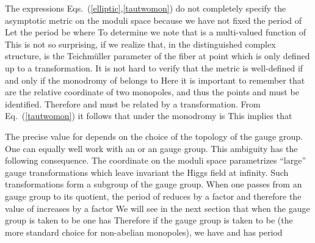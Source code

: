 \documentclass[a4paper,12pt, amsfonts, amssymb]{article}
\providecommand{\ZZ}{{\mathbb Z}}
\providecommand{\NN}{{\mathbb N}}
\providecommand{\ra}{\rightarrow}
\begin{document}
The expressions Eqs.~(\ref{elliptic},\ref{tautwomon}) do not completely specify the asymptotic metric on the moduli space because we have not fixed the period of \coordHE{}
Let the period be \coordHE{} where \coordHE{} To determine \coordHE{}
we note that \coordHE{} is a multi-valued function of \coordHE{} This is not
so surprising, if we realize that, in the distinguished complex structure,
\coordHE{} is the Teichm\"uller parameter of the \coordHE{} fiber at point \coordHE{}
which is only defined up to a \myHighlight{$PSL_2(\ZZ)$}\coordHE{} transformation. It is not hard to
verify that the metric is well-defined if and only if the monodromy of
\coordHE{} belongs to \myHighlight{$PSL_2(\ZZ).$}\coordHE{}
Here it is important to remember that \coordHE{} are the relative coordinate
of two monopoles, and thus the points \coordHE{} and \coordHE{}
must be identified. Therefore \coordHE{} and \coordHE{} must
be related by a \myHighlight{$PSL_2(\ZZ)$}\coordHE{} transformation. From Eq.~(\ref{tautwomon})
it follows that under \myHighlight{$z\ra -z$}\coordHE{} the monodromy is \myHighlight{$\tau\ra\tau +1.$}\coordHE{}
This implies that \myHighlight{$p\in\NN.$}\coordHE{}

The precise value for \coordHE{} depends on the choice of the topology of the
gauge group. One can equally well work with an \coordHE{} or an \myHighlight{$SO(3)=SU(2)/\ZZ_2$}\coordHE{} gauge group. This ambiguity has the following consequence. The coordinate \coordHE{} on the moduli space parametrizes ``large'' gauge transformations which leave invariant the Higgs field at infinity. Such transformations form
a \coordHE{} subgroup of the gauge group. When one passes from an \coordHE{}
gauge group to its \myHighlight{$\ZZ_2$}\coordHE{} quotient, the period of \coordHE{} reduces by a factor
\coordHE{} and therefore the value of \coordHE{} increases by a factor \coordHE{} We will
see in the next section that when the gauge group is taken to be \coordHE{}
one has \coordHE{} Therefore if the gauge group is taken to be \coordHE{} (the
more standard choice for non-abelian monopoles), we have \coordHE{} and
\coordHE{} has period \coordHE{}
\end{document}

